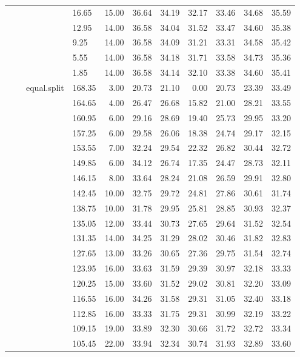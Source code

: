 \begin{longtable}{llllrrrrrrr}
   &  &  & 16.65 & 15.00 & 36.64 & 34.19 & 32.17 & 33.46 & 34.68 & 35.59 \\ 
   &  &  & 12.95 & 14.00 & 36.58 & 34.04 & 31.52 & 33.47 & 34.60 & 35.38 \\ 
   &  &  & 9.25 & 14.00 & 36.58 & 34.09 & 31.21 & 33.31 & 34.58 & 35.42 \\ 
   &  &  & 5.55 & 14.00 & 36.58 & 34.18 & 31.71 & 33.58 & 34.73 & 35.36 \\ 
   &  &  & 1.85 & 14.00 & 36.58 & 34.14 & 32.10 & 33.38 & 34.60 & 35.41 \\ 
   &  & equal.split & 168.35 & 3.00 & 20.73 & 21.10 & 0.00 & 20.73 & 23.39 & 33.49 \\ 
   &  &  & 164.65 & 4.00 & 26.47 & 26.68 & 15.82 & 21.00 & 28.21 & 33.55 \\ 
   &  &  & 160.95 & 6.00 & 29.16 & 28.69 & 19.40 & 25.73 & 29.95 & 33.20 \\ 
   &  &  & 157.25 & 6.00 & 29.58 & 26.06 & 18.38 & 24.74 & 29.17 & 32.15 \\ 
   &  &  & 153.55 & 7.00 & 32.24 & 29.54 & 22.32 & 26.82 & 30.44 & 32.72 \\ 
   &  &  & 149.85 & 6.00 & 34.12 & 26.74 & 17.35 & 24.47 & 28.73 & 32.11 \\ 
   &  &  & 146.15 & 8.00 & 33.64 & 28.24 & 21.08 & 26.59 & 29.91 & 32.80 \\ 
   &  &  & 142.45 & 10.00 & 32.75 & 29.72 & 24.81 & 27.86 & 30.61 & 31.74 \\ 
   &  &  & 138.75 & 10.00 & 31.78 & 29.95 & 25.81 & 28.85 & 30.93 & 32.37 \\ 
   &  &  & 135.05 & 12.00 & 33.44 & 30.73 & 27.65 & 29.64 & 31.52 & 32.54 \\ 
   &  &  & 131.35 & 14.00 & 34.25 & 31.29 & 28.02 & 30.46 & 31.82 & 32.83 \\ 
   &  &  & 127.65 & 13.00 & 33.26 & 30.65 & 27.36 & 29.75 & 31.54 & 32.74 \\ 
   &  &  & 123.95 & 16.00 & 33.63 & 31.59 & 29.39 & 30.97 & 32.18 & 33.33 \\ 
   &  &  & 120.25 & 15.00 & 33.60 & 31.52 & 29.02 & 30.81 & 32.20 & 33.09 \\ 
   &  &  & 116.55 & 16.00 & 34.26 & 31.58 & 29.31 & 31.05 & 32.40 & 33.18 \\ 
   &  &  & 112.85 & 16.00 & 33.33 & 31.75 & 29.31 & 30.99 & 32.19 & 33.22 \\ 
   &  &  & 109.15 & 19.00 & 33.89 & 32.30 & 30.66 & 31.72 & 32.72 & 33.34 \\ 
   &  &  & 105.45 & 22.00 & 33.94 & 32.34 & 30.74 & 31.93 & 32.89 & 33.60 \\ 

\end{longtable}
